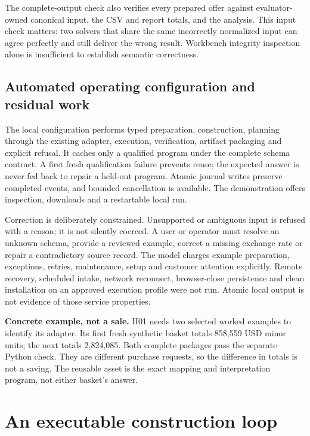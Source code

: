 \documentclass[11pt,letterpaper]{article}
\begin{document}
The complete-output check also verifies every prepared offer against evaluator-owned canonical input, the CSV and report totals, and the analysis. This input check matters: two solvers that share the same incorrectly normalized input can agree perfectly and still deliver the wrong result. Workbench integrity inspection alone is insufficient to establish semantic correctness.

\subsection{Automated operating configuration and residual work}

The local configuration performs typed preparation, construction, planning through the existing adapter, execution, verification, artifact packaging and explicit refusal. It caches only a qualified program under the complete schema contract. A first fresh qualification failure prevents reuse; the expected answer is never fed back to repair a held-out program. Atomic journal writes preserve completed events, and bounded cancellation is available. The demonstration offers inspection, downloads and a restartable local run.

Correction is deliberately constrained. Unsupported or ambiguous input is refused with a reason; it is not silently coerced. A user or operator must resolve an unknown schema, provide a reviewed example, correct a missing exchange rate or repair a contradictory source record. The model charges example preparation, exceptions, retries, maintenance, setup and customer attention explicitly. Remote recovery, scheduled intake, network reconnect, browser-close persistence and clean installation on an approved execution profile were not run. Atomic local output is not evidence of those service properties.

\begin{evidencebox}
\textbf{Concrete example, not a sale.} H01 needs two selected worked examples to identify its adapter. Its first fresh synthetic basket totals 858,559 USD minor units; the next totals 2,824,085. Both complete packages pass the separate Python check. They are different purchase requests, so the difference in totals is not a saving. The reusable asset is the exact mapping and interpretation program, not either basket's answer.
\end{evidencebox}

\section{An executable construction loop}
\label{sec:method}
\end{document}

